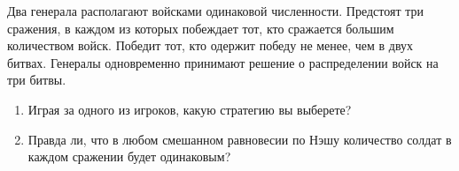 \begin{problem}
Два генерала располагают войсками одинаковой численности. Предстоят три сражения, в каждом из которых побеждает тот, кто сражается большим количеством войск. Победит тот, кто одержит победу не менее, чем в двух битвах. Генералы одновременно принимают решение о распределении войск на три битвы.
\begin{enumerate}

\item
Играя за одного из игроков, какую стратегию вы выберете?

\item Правда ли, что в любом смешанном равновесии по Нэшу количество солдат в каждом сражении будет одинаковым?

\end{enumerate}


\begin{sol}

\end{sol}
\end{problem}










